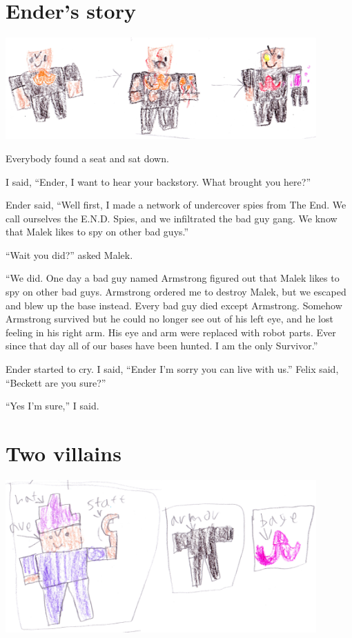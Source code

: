 \documentclass[12pt,twoside]{krantz}
\begin{document}
\hypertarget{enders-story}{%
\section{Ender's story}\label{enders-story}}

\includegraphics[width=4.6875in,height=\textheight]{img/four-bad-guys/armstrong.jpg}

Everybody found a seat and sat down.

I said, ``Ender, I want to hear your backstory. What brought you here?''

Ender said, ``Well first, I made a network of undercover spies from The
End. We call ourselves the E.N.D. Spies, and we infiltrated the bad guy
gang. We know that Malek likes to spy on other bad guys.''

``Wait you did?'' asked Malek.

``We did. One day a bad guy named Armstrong figured out that Malek likes
to spy on other bad guys. Armstrong ordered me to destroy Malek, but we
escaped and blew up the base instead. Every bad guy died except
Armstrong. Somehow Armstrong survived but he could no longer see out of
his left eye, and he lost feeling in his right arm. His eye and arm were
replaced with robot parts. Ever since that day all of our bases have
been hunted. I am the only Survivor.''

Ender started to cry. I said, ``Ender I'm sorry you can live with us.''
Felix said, ``Beckett are you sure?''

``Yes I'm sure,'' I said.

\hypertarget{two-villains}{%
\section{Two villains}\label{two-villains}}

\includegraphics[width=4.6875in,height=\textheight]{img/four-bad-guys/avestuff.jpg}
\end{document}
